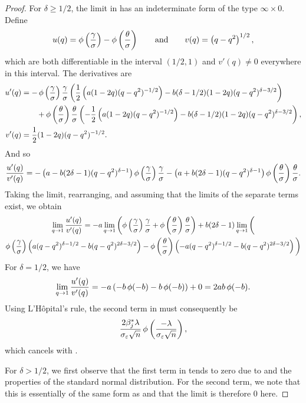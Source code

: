 \begin{proof}
  For \(\delta \geq 1/2\), the limit in  has an indeterminate form of the type \(\infty \times 0\). Define
  \[
    u(q) = \operatorname{\phi}\left(\frac{\gamma}{\sigma}\right) - \operatorname{\phi}\left(\frac{\theta}{\sigma}\right) \qquad\text{and}\qquad v(q) = \left(q - q^2\right)^{1/2},
  \]
  which are both differentiable in the interval \((1/2, 1)\) and \(v'(q) \neq 0\) everywhere in this interval. The derivatives are
  \[
    \begin{aligned}
      u'(q) & = -\operatorname{\phi}\left(\frac{\gamma}{\sigma}\right)\frac{\gamma}{\sigma} \left(\frac{1}{2}\left(a(1-2q)(q - q^2)^{-1/2}\right) - b(\delta - 1/2)(1- 2q)(q - q^2)^{\delta - 3/2}\right)          \\
            & \qquad + \operatorname{\phi}\left(\frac{\theta}{\sigma}\right) \frac{\theta}{\sigma} \left(-\frac{1}{2}\left(a(1-2q)(q - q^2)^{-1/2}\right) - b(\delta - 1/2)(1- 2q)(q - q^2)^{\delta - 3/2}\right), \\
      v'(q) & = \frac{1}{2} (1- 2q)(q - q^2)^{-1/2}.
    \end{aligned}
  \]
  And so
  \[
    \begin{aligned}
      \frac{u'(q)}{v'(q)} = -\left(a - b(2\delta - 1)(q - q^2)^{\delta - 1}\right) \operatorname{\phi}\left(\frac{\gamma}{\sigma}\right) \frac{\gamma}{\sigma} - \left(a + b(2\delta - 1)(q - q^2)^{\delta - 1}\right)\operatorname{\phi}\left(\frac{\theta}{\sigma}\right) \frac{\theta}{\sigma}.
    \end{aligned}
  \]
  Taking the limit, rearranging, and assuming that the limits of the separate terms exist, we obtain
  \begin{multline}
    \label{eq:eval-qlimit-pdfterm-split}
    \lim_{q \rightarrow 1} \frac{u'(q)}{v'(q)} = - a \lim_{q \rightarrow 1} \left( \operatorname{\phi}\left(\frac{\gamma}{\sigma}\right)\frac{\gamma}{\sigma} + \operatorname{\phi}\left(\frac{\theta}{\sigma}\right)\frac{\theta}{\sigma}\right)
    + b (2\delta - 1) \lim_{q \rightarrow 1} \bigg( \\ \operatorname{\phi}\left(\frac{\gamma}{\sigma}\right) \left(a(q -q^2)^{\delta - 1/2}- b(q - q^2)^{2\delta - 3/2} \right)                   -  \operatorname{\phi}\left(\frac{\theta}{\sigma}\right) \left(-a(q - q^2)^{\delta - 1/2} - b(q - q^2)^{2\delta - 3/2}\right) \bigg)
  \end{multline}
  For \(\delta = 1/2\), we have
  \[
    \lim_{q \rightarrow 1} \frac{u'(q)}{v'(q)} = -a\left(-b \operatorname{\phi}(-b) - b \operatorname{\phi}(-b)\right) + 0 = 2ab \operatorname{\phi}(-b).
  \]
  Using L'Hôpital's rule, the second term in  must consequently be
  \[
    \frac{2 \beta_j^* \lambda}{\sigma_\varepsilon \sqrt{n}} \operatorname{\phi} \left(\frac{-\lambda}{\sigma_\varepsilon\sqrt{n}}\right),
  \]
  which cancels with .

  For \(\delta > 1/2\), we first observe that the first term in  tends to zero due to  and
  the properties of the standard normal distribution. For the second term, we note that this is essentially
  of the same form as  and that the limit is therefore 0 here.
\end{proof}

